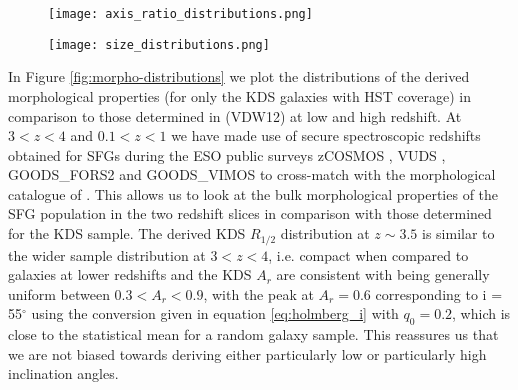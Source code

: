 \documentclass[fleqn,usenatbib]{mn2e}
\begin{document}
\begin{figure*}
    \centering \hspace{-2.0cm}
    \begin{subfigure}[h!]{0.50\textwidth}
        \centering
        \texttt{[image: axis\_ratio\_distributions.png]}
    \end{subfigure} \hspace{0.4cm}
    \begin{subfigure}[h!]{0.50\textwidth}
        \centering
        \texttt{[image: size\_distributions.png]}
    \end{subfigure}
    \caption{We crossmatch publicly available spectroscopic redshifts for SFGs, as discussed in the text, with the morphological catalogue presented in VDW12 in two different redshift slices.
    This provides a set of reference morphological properties for typical SFGs at different evolutionary stages to which the derived KDS values can be compared.
    We find that the KDS galaxies are much more compact than those at low redshift, as traced by $R_{1/2}$ parameter, which could partially be explained by the F160W filter tracing a younger stellar population at $z\sim3.5$.
    The distribution of KDS $R_{1/2}$ values are consistent with those in the higher redshift reference sample.
    The $A_{r}$ distribution appears to be constant with time as traced by the reference samples, and the KDS values are in good agreement with a relatively uniform distribution spanning $0.3 < A_{r} < 0.9$.
    This shows that we have not been biased towards deriving low or high $A_{r}$ values.}
    \label{fig:morpho-distributions}
\end{figure*}

In Figure \ref{fig:morpho-distributions} we plot the distributions of the derived morphological properties (for only the KDS galaxies with HST coverage) in comparison to those determined in \cite{VanderWel2012} (VDW12) at low and high redshift.
At $3 < z < 4$ and $0.1 < z < 1$ we have made use of secure spectroscopic redshifts obtained for SFGs during the ESO public surveys zCOSMOS \citep{Lilly2007}, VUDS \citep{Tasca2016}, GOODS\_FORS2 \citep{Vanzella2005,Vanzella2006,Vanzella2008} and GOODS\_VIMOS \citep{Balestra2010} to cross-match with the morphological catalogue of \cite{VanderWel2012}.
This allows us to look at the bulk morphological properties of the SFG population in the two redshift slices in comparison with those determined for the KDS sample.
The derived KDS $R_{1/2}$ distribution at $z \sim 3.5$ is similar to the wider sample distribution at $3 < z  < 4$, i.e. compact when compared to galaxies at lower redshifts and the KDS $A_{r}$ are consistent with being generally uniform between $0.3 < A_{r} < 0.9$, with the peak at $A_{r} = 0.6$ corresponding to i = 55$^{\circ}$ using the conversion given in equation \ref{eq:holmberg_i} with $q_{0}=0.2$, which is close to the statistical mean for a random galaxy sample.
This reassures us that we are not biased towards deriving either particularly low or particularly high inclination angles.
\end{document}
